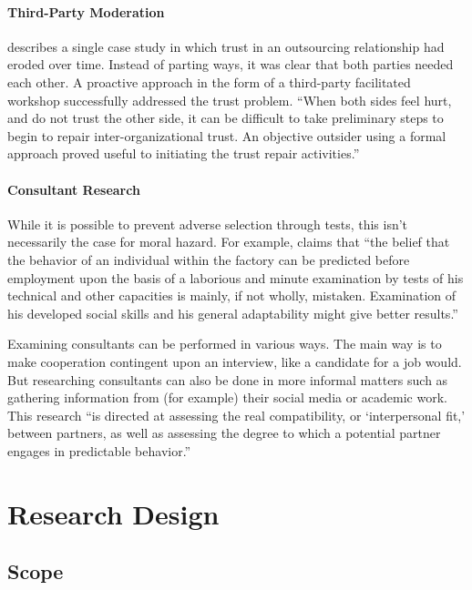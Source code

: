 \documentclass[12pt]{article}
\begin{document}
\paragraph{Third-Party Moderation}\label{third-party-moderation}

\citet[6-7]{babin2017} describes a single case study in which trust in
an outsourcing relationship had eroded over time. Instead of parting
ways, it was clear that both parties needed each other. A proactive
approach in the form of a third-party facilitated workshop successfully
addressed the trust problem. ``When both sides feel hurt, and do not
trust the other side, it can be difficult to take preliminary steps to
begin to repair inter-organizational trust. An objective outsider using
a formal approach proved useful to initiating the trust repair
activities.''

\paragraph{Consultant Research}\label{consultant-research}

While it is possible to prevent adverse selection through tests, this
isn't necessarily the case for moral hazard. For example,
\citet[111]{mayo1945} claims that ``the belief that the behavior of an
individual within the factory can be predicted before employment upon
the basis of a laborious and minute examination by tests of his
technical and other capacities is mainly, if not wholly, mistaken.
Examination of his developed social skills and his general adaptability
might give better results.''

Examining consultants can be performed in various ways. The main way is
to make cooperation contingent upon an interview, like a candidate for a
job would. But researching consultants can also be done in more informal
matters such as gathering information from (for example) their social
media or academic work. This research ``is directed at assessing the
real compatibility, or `interpersonal fit,' between partners, as well as
assessing the degree to which a potential partner engages in predictable
behavior.'' \citep[ 370]{shapiro1992}

\section{Research Design}\label{research-design}

\subsection{Scope}\label{scope}
\end{document}
